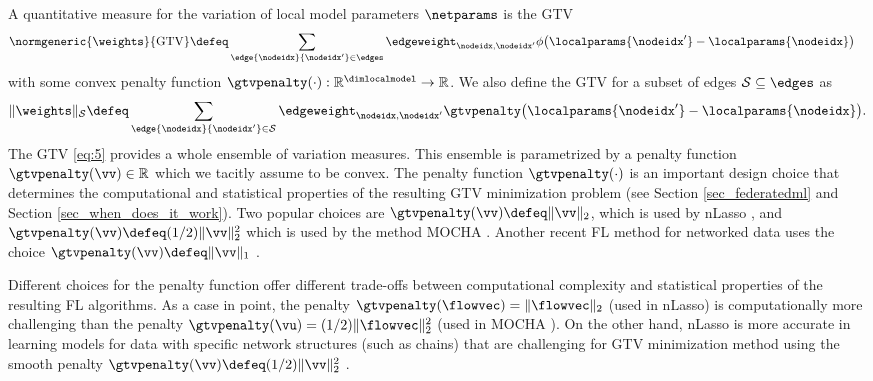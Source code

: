 \documentclass[lettersize,journal]{IEEEtran}
\begin{document}
A quantitative measure for the variation of local model parameters $\netparams$ is the GTV
\begin{equation} \label{eq:5}
\begin{aligned}
    &{\normgeneric{\weights}{\rm GTV}   \defeq \sum_{\edge{\nodeidx}{\nodeidx'} \in \edges} \edgeweight_{\nodeidx,\nodeidx'} \phi\big(\localparams{\nodeidx'} -\localparams{\nodeidx}  \big) }
\end{aligned}
\vspace{-2mm}
\end{equation}
 with some convex penalty function $\gtvpenalty(\cdot): \mathbb{R}^{\dimlocalmodel} \rightarrow \mathbb{R}$.
We also define the GTV for a subset of edges $\mathcal{S} \subseteq \edges$ as 
\begin{equation} \label{eq:def_GTV_subset}
	\| \weights \|_{\mathcal{S}}  \defeq \sum_{\edge{\nodeidx}{\nodeidx'} \in \mathcal{S}} \edgeweight_{\nodeidx,\nodeidx'} \gtvpenalty\big(\localparams{\nodeidx'} -\localparams{\nodeidx}  \big).
 \vspace{-2mm}
\end{equation} 
The GTV \eqref{eq:5} provides a whole ensemble of variation measures. This ensemble is parametrized by a 
penalty function $\gtvpenalty(\vv) \in \mathbb{R}$ which we tacitly assume to be convex. The penalty 
function $\gtvpenalty(\cdot)$ is an important design choice that determines the computational and 
statistical properties of the resulting GTV minimization problem (see Section \ref{sec_federatedml} 
and Section \ref{sec_when_does_it_work}). Two popular choices are $\gtvpenalty(\vv) \defeq \| \vv\|_{2}$, 
which is used by nLasso \cite{NetworkLasso}, and $\gtvpenalty(\vv) \defeq (1/2)\| \vv\|^{2}_{2}$ 
which is used by the method {\rm MOCHA} \cite{Smith2017}. Another recent FL method for networked data uses 
the choice $\gtvpenalty(\vv) \defeq \| \vv \|_{1}$ \cite{Sarchesh2021}. 

Different choices for the penalty function offer different trade-offs between computational complexity and 
statistical properties of the resulting FL algorithms. As a case in point, the penalty $\gtvpenalty(\flowvec)= \|\flowvec\|_{2}$ (used in nLasso) 
is computationally more challenging than the penalty $\gtvpenalty(\vu)= (1/2) \|\flowvec\|_{2}^{2}$ (used in {\rm MOCHA} \cite{Smith2017}). 
On the other hand, nLasso is more accurate in learning models for data with specific 
network structures (such as chains) that are challenging for GTV minimization method using the 
smooth penalty $\gtvpenalty(\vv) \defeq (1/2)\| \vv\|^{2}_{2}$ \cite{WhenIsNLASSO}.  
\end{document}
